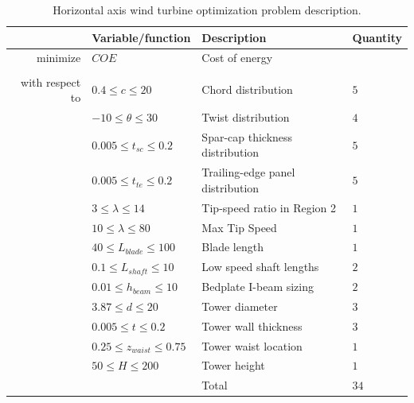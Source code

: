 \documentclass[]{aiaa-tc} %
\begin{document}
    \begin{table}
        \centering
        \caption{Horizontal axis wind turbine optimization problem description.}
        \begin{tabular}{r l l l}
            \hline
            & Variable/function & Description & Quantity \\
            \hline
            minimize            & $COE$ & Cost of energy \\
            \\
            with respect to & $0.4 \le c \le 20$ & Chord distribution & $5$ \\
                                    & $-10 \le \theta \le 30$ & Twist distribution & $4$ \\
                                    & $0.005 \le t_{sc} \le 0.2$ & Spar-cap thickness distribution & $5$ \\
                                    & $0.005 \le t_{te} \le 0.2$ & Trailing-edge panel distribution & $5$ \\
                                    & $3 \le \lambda \le 14$ & Tip-speed ratio in Region 2 & $1$ \\
                                    & $10 \le \lambda \le 80$ & Max Tip Speed & $1$ \\
                                    & $40 \le L_{blade} \le 100$ & Blade length & $1$ \\
                                    & $0.1 \le L_{shaft} \le 10$ & Low speed shaft lengths & $2$ \\
                                    & $0.01 \le h_{beam} \le 10$ & Bedplate I-beam sizing & $2$ \\
                                    & $3.87 \le d \le 20$ & Tower diameter & $3$ \\
                                    & $0.005 \le t \le 0.2$ & Tower wall thickness & $3$ \\
                                    & $0.25 \le z_{waist} \le 0.75$ & Tower waist location & $1$ \\
                                    & $50 \le H \le 200$ & Tower height & $1$ \\
                                    & & Total & $34$ \\


\end{tabular}
\end{table}
\end{document}
